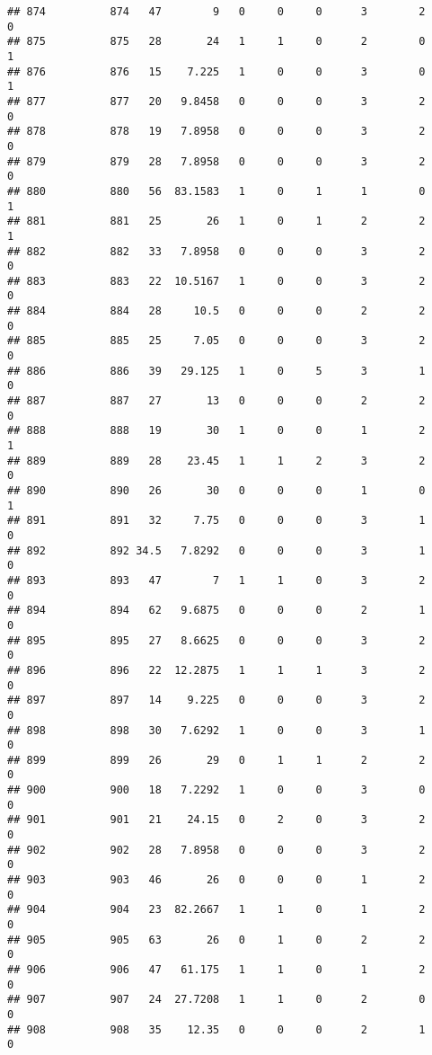 \documentclass[
]{article}
\begin{document}
\begin{verbatim}
## 874          874   47        9   0     0     0      3        2         0
## 875          875   28       24   1     1     0      2        0         1
## 876          876   15    7.225   1     0     0      3        0         1
## 877          877   20   9.8458   0     0     0      3        2         0
## 878          878   19   7.8958   0     0     0      3        2         0
## 879          879   28   7.8958   0     0     0      3        2         0
## 880          880   56  83.1583   1     0     1      1        0         1
## 881          881   25       26   1     0     1      2        2         1
## 882          882   33   7.8958   0     0     0      3        2         0
## 883          883   22  10.5167   1     0     0      3        2         0
## 884          884   28     10.5   0     0     0      2        2         0
## 885          885   25     7.05   0     0     0      3        2         0
## 886          886   39   29.125   1     0     5      3        1         0
## 887          887   27       13   0     0     0      2        2         0
## 888          888   19       30   1     0     0      1        2         1
## 889          889   28    23.45   1     1     2      3        2         0
## 890          890   26       30   0     0     0      1        0         1
## 891          891   32     7.75   0     0     0      3        1         0
## 892          892 34.5   7.8292   0     0     0      3        1         0
## 893          893   47        7   1     1     0      3        2         0
## 894          894   62   9.6875   0     0     0      2        1         0
## 895          895   27   8.6625   0     0     0      3        2         0
## 896          896   22  12.2875   1     1     1      3        2         0
## 897          897   14    9.225   0     0     0      3        2         0
## 898          898   30   7.6292   1     0     0      3        1         0
## 899          899   26       29   0     1     1      2        2         0
## 900          900   18   7.2292   1     0     0      3        0         0
## 901          901   21    24.15   0     2     0      3        2         0
## 902          902   28   7.8958   0     0     0      3        2         0
## 903          903   46       26   0     0     0      1        2         0
## 904          904   23  82.2667   1     1     0      1        2         0
## 905          905   63       26   0     1     0      2        2         0
## 906          906   47   61.175   1     1     0      1        2         0
## 907          907   24  27.7208   1     1     0      2        0         0
## 908          908   35    12.35   0     0     0      2        1         0

\end{verbatim}
\end{document}
